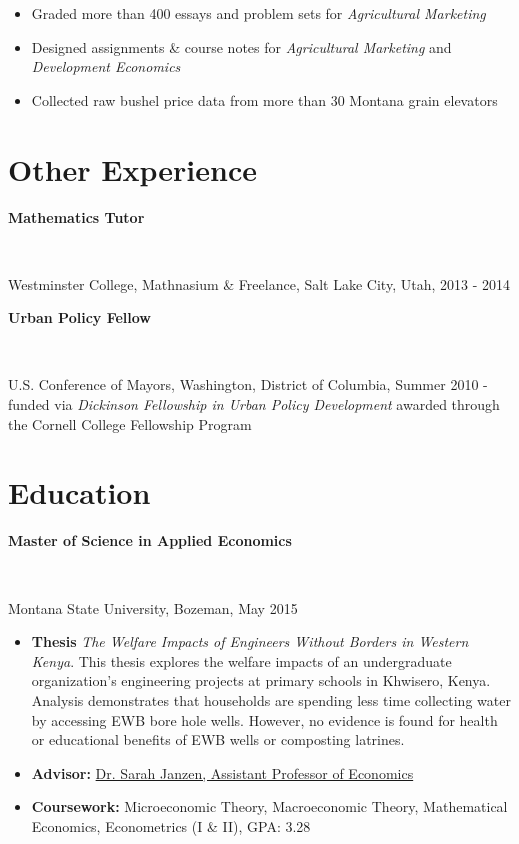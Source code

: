 \documentclass[resmargin, line, pifont ,palatino,courier]{res}
\newcommand{\tab}[1][1cm]{\hspace*{#1}}
\newcommand{\subtext}[1]{\tighter ~ \newline \tab[0.5cm] \parbox{\fullwidth}{#1}}
\newcommand{\fullwidth}{11.5cm}
\newcommand{\tight}{\vspace{-0.5cm}}
\newcommand{\tighter}{\vspace{-0.75cm}}
\begin{document}
\begin{resume}
	\begin{itemize}
		\item Graded more than 400 essays and problem sets for \textit{Agricultural Marketing}
		\item Designed assignments \& course notes for \textit{Agricultural Marketing} and \textit{Development Economics}
		\item Collected raw bushel price data from more than 30 Montana grain elevators
	\end{itemize}

\section{\sc Other \newline Experience}

\textbf{Mathematics Tutor} 

	\subtext{Westminster College, Mathnasium \& Freelance, Salt Lake City, Utah, 2013 - 2014}

\textbf{Urban Policy Fellow}  

	\subtext{U.S. Conference of Mayors, Washington, District of Columbia, Summer 2010 - funded via \emph{Dickinson Fellowship in Urban Policy Development} awarded through the Cornell College Fellowship Program}
		
\newpage

\section{\sc Education}

\textbf{Master of Science in Applied Economics}

	\subtext{Montana State University, Bozeman, May 2015}
	
	\tight
	
\begin{itemize}
	\item \textbf{Thesis} \emph{The Welfare Impacts of Engineers Without Borders in Western Kenya}.  This thesis explores the welfare impacts of an undergraduate organization's engineering projects at primary schools in Khwisero, Kenya. Analysis demonstrates that households are spending less time collecting water by accessing EWB bore hole wells. However, no evidence is found for health or educational benefits of  EWB wells or composting latrines.  
	\item \textbf{Advisor:} \href{http://www.montana.edu/sjanzen}{Dr. Sarah Janzen, Assistant Professor of Economics}
	\item \textbf{Coursework:} Microeconomic Theory, Macroeconomic Theory, Mathematical Economics, Econometrics (I \& II), GPA: 3.28
\end{itemize}


\end{resume}
\end{document}
